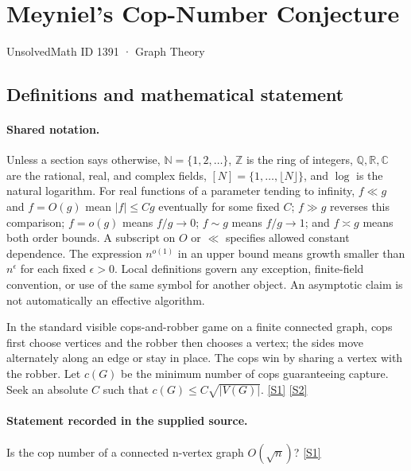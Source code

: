 \documentclass[11pt,a4paper]{article}
\newcommand{\N}{\mathbb{N}}
\newcommand{\Z}{\mathbb{Z}}
\newcommand{\Q}{\mathbb{Q}}
\newcommand{\R}{\mathbb{R}}
\newcommand{\C}{\mathbb{C}}
\newcommand{\sref}[2]{\hyperlink{source:#1:#2}{[S#2]}}
\begin{document}

\setcounter{section}{1390}

\section{Meyniel’s Cop-Number Conjecture}\label{1391}

{\small\sffamily UnsolvedMath ID 1391 · Graph Theory}

\subsection{Definitions and mathematical statement}

\paragraph{Shared notation.}Unless a section says otherwise, $\N=\{1,2,\ldots\}$,
$\Z$ is the ring of integers, $\Q,\R,\C$ are the rational, real, and complex
fields, $[N]=\{1,\ldots,\lfloor N\rfloor\}$, and $\log$ is the natural
logarithm. For real functions of a parameter tending to infinity,
$f\ll g$ and $f=O(g)$ mean $|f|\leq Cg$ eventually for some fixed $C$;
$f\gg g$ reverses this comparison; $f=o(g)$ means $f/g\to0$;
$f\sim g$ means $f/g\to1$; and $f\asymp g$ means both order bounds.
A subscript on $O$ or $\ll$ specifies allowed constant dependence.
The expression $n^{o(1)}$ in an upper bound means growth smaller than
$n^\epsilon$ for each fixed $\epsilon>0$. Local definitions govern any
exception, finite-field convention, or use of the same symbol for another
object. An asymptotic claim is not automatically an effective algorithm.



In the standard visible cops-and-robber game on a finite connected graph, cops first choose vertices and the robber then chooses a vertex; the sides move alternately along an edge or stay in place. The cops win by sharing a vertex with the robber. Let $c(G)$ be the minimum number of cops guaranteeing capture. Seek an absolute $C$ such that $c(G)\leq C\sqrt{|V(G)|}$. \sref{1391}{1} \sref{1391}{2}

\paragraph{Statement recorded in the supplied source.}
Is the cop number of a connected n-vertex graph $O(\sqrt{n})$? \sref{1391}{1}
\end{document}
